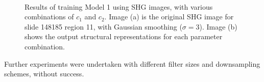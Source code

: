 \documentclass{report}
\begin{document}
\begin{figure}
\centering
{} \\
\caption{Results of training Model 1 using SHG images, with various combinations of $c_1$ and $c_2$. Image (a) is the original SHG image for slide 148185 region 11, with Gaussian smoothing ($\sigma=3$). Image (b) shows the output structural representations for each parameter combination.}
\label{fig:shg_tuning}
\end{figure}

Further experiments were undertaken with different filter sizes and downsampling schemes, without success.
\end{document}
